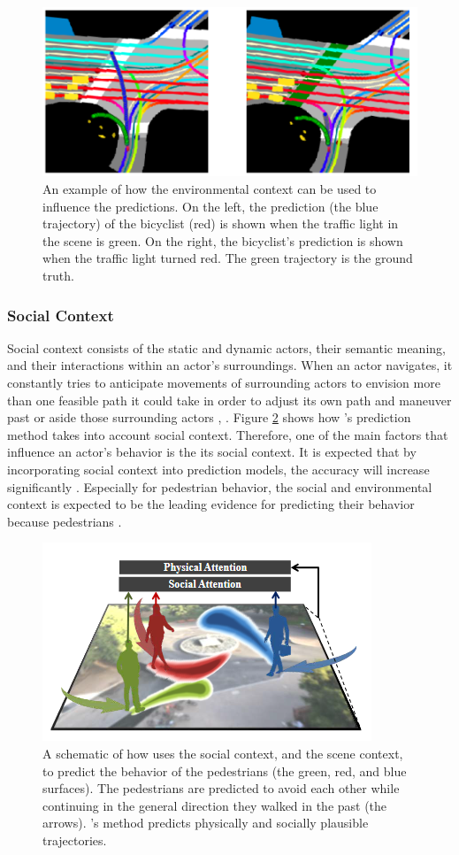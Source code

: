 \begin{figure}[h!]
	\centering
	\includegraphics[width=0.5\linewidth]{Figures/Introduction/Environmental_Context_TRaffic_Light_Chou}
	\caption{An example of how the environmental context can be used to influence the predictions. On the left, the prediction (the blue trajectory) of the bicyclist (red) is shown when the traffic light in the scene is green. On the right, the bicyclist's prediction is shown when the traffic light turned red. The green trajectory is the ground truth. \cite{chou2020predicting}}  
	\label{fig:env_cont}
\end{figure}


\subsubsection{Social Context}
Social context consists of the static and dynamic actors, their semantic meaning, and their interactions within an actor's surroundings. When an actor navigates, it constantly tries to anticipate movements of surrounding actors to envision more than one feasible path it could take in order to adjust its own path and maneuver past or aside those surrounding actors \cite{sadeghian2019sophie}, \cite{manh2018scene}. Figure \ref{fig:soc_cont} shows how \cite{sadeghian2019sophie}'s prediction method takes into account social context. Therefore, one of the main factors that influence an actor's behavior is the its social context. It is expected that by incorporating social context into prediction models, the accuracy will increase significantly \cite{pfeiffer2018data}. 
Especially for pedestrian behavior, the social and environmental context is expected to be the leading evidence for predicting their behavior because pedestrians  \cite{uah2020d4}. 

\begin{figure}[h!]
	\centering
	\includegraphics[width=0.4\linewidth]{Figures/Introduction/Social_context_Sadeghian}
	\caption{A schematic of how \cite{sadeghian2019sophie} uses the social context, and the scene context, to predict the behavior of the pedestrians (the green, red, and blue surfaces). The pedestrians are predicted to avoid each other while continuing in the general direction they walked in the past (the arrows). \cite{sadeghian2019sophie}'s method predicts physically and socially plausible trajectories.}  
	\label{fig:soc_cont}
\end{figure}

